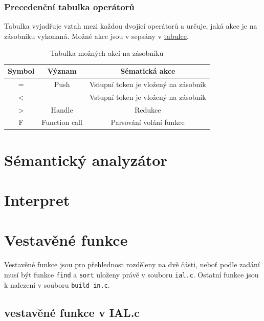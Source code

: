 \documentclass[a4paper,11pt]{article}
\begin{document}
\subsubsection{Precedenční tabulka operátorů}


Tabulka vyjadřuje vztah mezi každou dvojicí operátorů a určuje, jaká akce je na zásobníku vykonaná. Možné akce jsou v sepsány v \hyperref[tab:stackRules]{tabulce}.

\begin{table}[]
\centering
\label{tab:stackRules}
\begin{tabular}{@{}ccc@{}}
\toprule
Symbol       & Význam                            & Sématická akce                         \\ \midrule
=            & Push                              & Vstupní token je vložený na zásobník  \\
\textless    &                                   & Vstupní token je vložený na zásobník \\
\textgreater & Handle                            & Redukce                                \\
F            & Function call                     & Parsování volání funkce \\ \bottomrule
\end{tabular}
\caption{Tabulka možných akcí na zásobníku}
\end{table}

\section{Sémantický analyzátor}


\section{Interpret}

\section{Vestavěné funkce}
Vestavěné funkce jsou pro přehlednost rozděleny na dvě části, neboť podle zadání musí být funkce \texttt{find} a \texttt{sort} uloženy právě v souboru \texttt{ial.c}. Ostatní funkce jsou k nalezení v souboru \texttt{build\_in.c}.

\subsection {vestavěné funkce v IAL.c}
\end{document}

